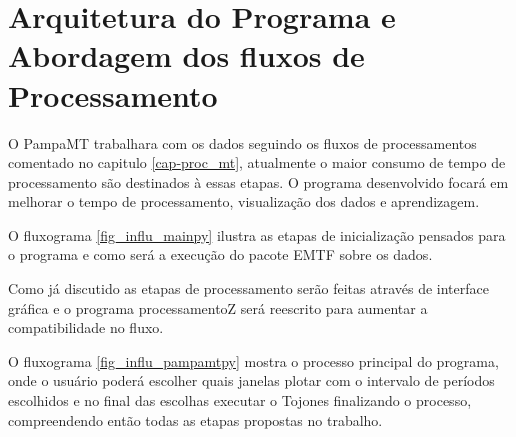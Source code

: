     \section{Arquitetura do Programa e Abordagem dos fluxos de Processamento}
        \label{cap-algoritmos}
    
    
    O PampaMT trabalhara com os dados seguindo os fluxos de processamentos comentado no capitulo \ref{cap-proc_mt}, atualmente o maior consumo de tempo de processamento são destinados à essas etapas. O programa desenvolvido focará em melhorar o tempo de processamento, visualização dos dados e aprendizagem.
    
    O fluxograma \ref{fig_influ_mainpy} ilustra as etapas de inicialização pensados para o programa e como será a execução do pacote EMTF sobre os dados.
    
    Como já discutido as etapas de processamento serão feitas através de interface gráfica e o programa processamentoZ será reescrito para aumentar a compatibilidade no fluxo.
    
    O fluxograma \ref{fig_influ_pampamtpy} mostra o processo principal do programa, onde o usuário poderá escolher quais janelas plotar com o intervalo de períodos escolhidos e no final das escolhas executar o Tojones finalizando o processo, compreendendo então todas as etapas propostas no trabalho.
    

